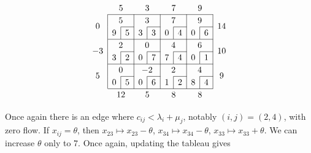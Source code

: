 \[
	\arraycolsep=5pt\def\arraystretch{1.2}
	\begin{array}{c|c|c|c|c|c|c|c|c|c}
		\multicolumn{1}{c}{}    & \multicolumn{2}{c}{5}  & \multicolumn{2}{c}{3}   & \multicolumn{2}{c}{7}  & \multicolumn{2}{c}{9}  & \multicolumn{1}{c}{}                                       \\\cline{2-9}
		\multirow{2}{*}{\(0\)}  & \multicolumn{2}{c|}{5} & \multicolumn{2}{c|}{3}  & \multicolumn{2}{c|}{7} & \multicolumn{2}{c|}{9} & \multirow{2}{*}{\(14\)}                                    \\\cline{3-3}\cline{5-5}\cline{7-7}\cline{9-9}
		                        & \multicolumn{1}{c|}{9} & 5                       & \multicolumn{1}{c|}{3} & 3                      & \multicolumn{1}{c|}{0}  & 4 & \multicolumn{1}{c|}{0} & 6 & \\\cline{2-9}
		\multirow{2}{*}{\(-3\)} & \multicolumn{2}{c|}{2} & \multicolumn{2}{c|}{0}  & \multicolumn{2}{c|}{4} & \multicolumn{2}{c|}{6} & \multirow{2}{*}{\(10\)}                                    \\\cline{3-3}\cline{5-5}\cline{7-7}\cline{9-9}
		                        & \multicolumn{1}{c|}{3} & 2                       & \multicolumn{1}{c|}{0} & 7                      & \multicolumn{1}{c|}{7}  & 4 & \multicolumn{1}{c|}{0} & 1 & \\\cline{2-9}
		\multirow{2}{*}{\(5\)}  & \multicolumn{2}{c|}{0} & \multicolumn{2}{c|}{-2} & \multicolumn{2}{c|}{2} & \multicolumn{2}{c|}{4} & \multirow{2}{*}{\(9\)}                                     \\\cline{3-3}\cline{5-5}\cline{7-7}\cline{9-9}
		                        & \multicolumn{1}{c|}{0} & 5                       & \multicolumn{1}{c|}{0} & 6                      & \multicolumn{1}{c|}{1}  & 2 & \multicolumn{1}{c|}{8} & 4 & \\\cline{2-9}
		\multicolumn{1}{c}{}    & \multicolumn{2}{c}{12} & \multicolumn{2}{c}{5}   & \multicolumn{2}{c}{8}  & \multicolumn{2}{c}{8}  & \multicolumn{1}{c}{}
	\end{array}
\]

\noindent Once again there is an edge where \( c_{ij} < \lambda_i + \mu_j \), notably \((i,j) = (2,4)\), with zero flow.
If \( x_{ij} = \theta \), then \( x_{23} \mapsto x_{23} - \theta \), \( x_{34} \mapsto x_{34} - \theta \), \( x_{33} \mapsto x_{33} + \theta \).
We can increase \( \theta \) only to \( 7 \).
Once again, updating the tableau gives

